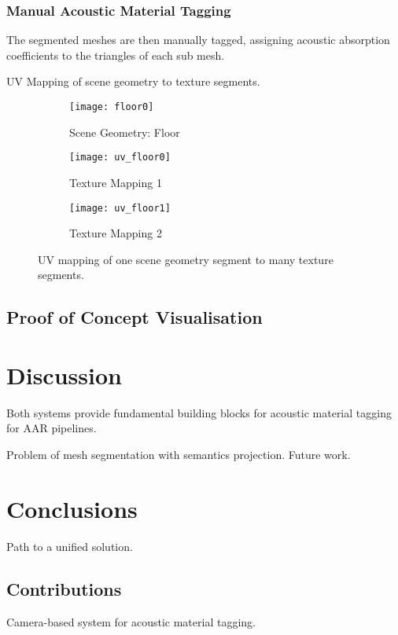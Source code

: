 \subsubsection{Manual Acoustic Material Tagging}
The segmented meshes are then manually tagged, assigning acoustic absorption coefficients to the triangles of each sub mesh.

UV Mapping of scene geometry to texture segments.

\begin{figure}
    \centering
    \begin{subfigure}{0.75\textwidth}
        \texttt{[image: floor0]}
        \caption{Scene Geometry: Floor}
        \label{fig:floor}
    \end{subfigure}
    \hfill
    \begin{subfigure}{0.42\textwidth}
        \texttt{[image: uv\_floor0]}
        \caption{Texture Mapping 1}
        \label{fig:uv_floor}
    \end{subfigure}
    \hfill
    \begin{subfigure}{0.42\textwidth}
        \texttt{[image: uv\_floor1]}
        \caption{Texture Mapping 2}
        \label{fig:uv_floor2}
    \end{subfigure}
            
    \caption{UV mapping of one scene geometry segment to many texture segments.}
    \label{fig:uv_mapping_demo}
\end{figure}

\subsection{Proof of Concept Visualisation}

\section{Discussion}
Both systems provide fundamental building blocks for acoustic material tagging for AAR pipelines.

Problem of mesh segmentation with semantics projection. Future work.



\section{Conclusions}
Path to a unified solution.


\subsection{Contributions}
Camera-based system for acoustic material tagging.

